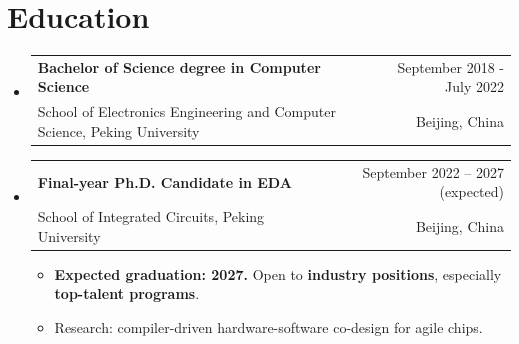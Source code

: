 \documentclass[letterpaper,11pt]{article} %
\makeatletter
\newcommand{\CVItem}[1]{
  \item\small #1 \vspace{-2pt}
}
\newcommand{\CVSubheading}[4]{
  \vspace{-2pt}\item
    \begin{tabular*}{0.97\textwidth}[t]{l@{\extracolsep{\fill}}r}
      \textbf{#1} & #2 \\
      \small#3 & \small #4 \\
    \end{tabular*}\vspace{-7pt}
}
\newcommand{\CVSubHeadingListStart}{\begin{itemize}[leftmargin=0.5cm, label={}]}
\newcommand{\CVSubHeadingListEnd}{\end{itemize}}
\newcommand{\CVItemListStart}{\begin{itemize}}
\newcommand{\CVItemListEnd}{\end{itemize}\vspace{-5pt}}
\makeatother
\begin{document}

\section{Education}
  \CVSubHeadingListStart
    \CVSubheading
      {{Bachelor of Science degree in Computer Science}}{September 2018 - July 2022}
      {School of Electronics Engineering and Computer Science, Peking University}{Beijing, China}
    \CVSubheading
      {{Final-year Ph.D. Candidate in EDA}}{September 2022 -- 2027 (expected)}
      {School of Integrated Circuits, Peking University}{Beijing, China}
      \CVItemListStart
        \CVItem{\textbf{Expected graduation: 2027.} Open to \textbf{industry positions}, especially \textbf{top-talent programs}.}
        \CVItem{Research: compiler-driven hardware-software co-design for agile chips.}
      \CVItemListEnd
  \CVSubHeadingListEnd
\end{document}
